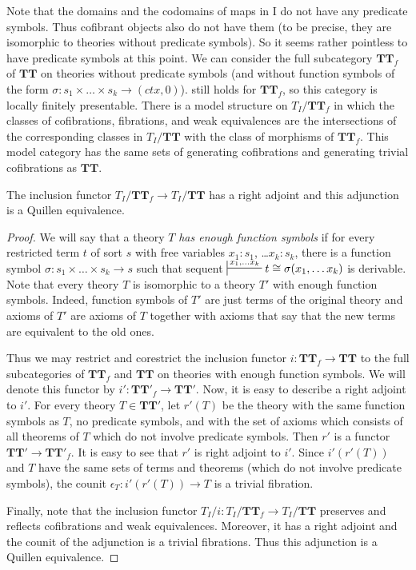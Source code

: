 \documentclass[reqno]{amsart}
\theoremstyle{definition}
\theoremstyle{remark}
\newcommand{\cat}[1]{\mathbf{#1}}
\newcommand{\algtt}{\cat{TT}}
\newcommand{\I}{\mathrm{I}}
\numberwithin{figure}{section}
\begin{document}
Note that the domains and the codomains of maps in $\I$ do not have any predicate symbols.
Thus cofibrant objects also do not have them (to be precise, they are isomorphic to theories without predicate symbols).
So it seems rather pointless to have predicate symbols at this point.
We can consider the full subcategory $\algtt_f$ of $\algtt$ on theories without predicate symbols
(and without function symbols of the form $\sigma : s_1 \times \ldots \times s_k \to (ctx,0)$).
 still holds for $\algtt_f$, so this category is locally finitely presentable.
There is a model structure on $T_I/\algtt_f$ in which the classes of cofibrations, fibrations, and weak equivalences
are the intersections of the corresponding classes in $T_I/\algtt$ with the class of morphisms of $\algtt_f$.
This model category has the same sets of generating cofibrations and generating trivial cofibrations as $\algtt$.

\begin{prop}
The inclusion functor $T_I/\algtt_f \to T_I/\algtt$ has a right adjoint and this adjunction is a Quillen equivalence.
\end{prop}
\begin{proof}
We will say that a theory $T$ \emph{has enough function symbols} if for every restricted term $t$ of sort $s$ with free variables $x_1 : s_1$, \ldots $x_k : s_k$,
there is a function symbol $\sigma : s_1 \times \ldots \times s_k \to s$ such that sequent $\sststile{}{x_1, \ldots x_k} t \cong \sigma(x_1, \ldots x_k)$ is derivable.
Note that every theory $T$ is isomorphic to a theory $T'$ with enough function symbols.
Indeed, function symbols of $T'$ are just terms of the original theory and
axioms of $T'$ are axioms of $T$ together with axioms that say that the new terms are equivalent to the old ones.

Thus we may restrict and corestrict the inclusion functor $i : \algtt_f \to \algtt$ to the full subcategories of $\algtt_f$ and $\algtt$ on theories with enough function symbols.
We will denote this functor by $i' : \algtt'_f \to \algtt'$.
Now, it is easy to describe a right adjoint to $i'$.
For every theory $T \in \algtt'$, let $r'(T)$ be the theory with the same function symbols as $T$, no predicate symbols,
and with the set of axioms which consists of all theorems of $T$ which do not involve predicate symbols.
Then $r'$ is a functor $\algtt' \to \algtt'_f$.
It is easy to see that $r'$ is right adjoint to $i'$.
Since $i'(r'(T))$ and $T$ have the same sets of terms and theorems (which do not involve predicate symbols), the counit $\epsilon_T : i'(r'(T)) \to T$ is a trivial fibration.

Finally, note that the inclusion functor $T_I/i : T_I/\algtt_f \to T_I/\algtt$ preserves and reflects cofibrations and weak equivalences.
Moreover, it has a right adjoint and the counit of the adjunction is a trivial fibrations.
Thus this adjunction is a Quillen equivalence.
\end{proof}
\end{document}
